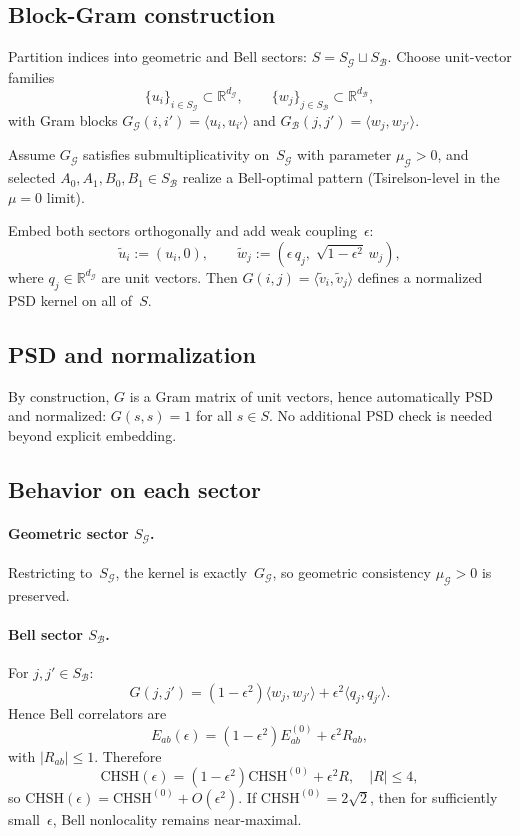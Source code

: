 \documentclass[11pt,a4paper]{article}
\theoremstyle{definition}
\theoremstyle{remark}
\newcommand{\CHSH}{\mathrm{CHSH}}
\newcommand{\ip}[2]{\langle #1, #2 \rangle}
\begin{document}
\subsection{Block-Gram construction}

Partition indices into geometric and Bell sectors: $S = S_{\mathcal{G}} \sqcup S_{\mathcal{B}}$. Choose unit-vector families
\[
\{u_i\}_{i \in S_{\mathcal{G}}} \subset \mathbb{R}^{d_{\mathcal{G}}}, \qquad \{w_j\}_{j \in S_{\mathcal{B}}} \subset \mathbb{R}^{d_{\mathcal{B}}},
\]
with Gram blocks $G_{\mathcal{G}}(i,i') = \ip{u_i}{u_{i'}}$ and $G_{\mathcal{B}}(j,j') = \ip{w_j}{w_{j'}}$.

Assume $G_{\mathcal{G}}$ satisfies submultiplicativity on~$S_{\mathcal{G}}$ with parameter $\mu_{\mathcal{G}} > 0$, and selected $A_0, A_1, B_0, B_1 \in S_{\mathcal{B}}$ realize a Bell-optimal pattern (Tsirelson-level in the $\mu = 0$ limit).

Embed both sectors orthogonally and add weak coupling~$\epsilon$:
\[
\tilde{u}_i := (u_i, 0), \qquad \tilde{w}_j := (\epsilon\, q_j,\; \sqrt{1-\epsilon^2}\, w_j),
\]
where $q_j \in \mathbb{R}^{d_{\mathcal{G}}}$ are unit vectors. Then $G(i,j) = \ip{\tilde{v}_i}{\tilde{v}_j}$ defines a normalized PSD kernel on all of~$S$.

\subsection{PSD and normalization}

By construction, $G$ is a Gram matrix of unit vectors, hence automatically PSD and normalized: $G(s,s) = 1$ for all $s \in S$. No additional PSD check is needed beyond explicit embedding.

\subsection{Behavior on each sector}

\paragraph{Geometric sector $S_{\mathcal{G}}$.}
Restricting to~$S_{\mathcal{G}}$, the kernel is exactly~$G_{\mathcal{G}}$, so geometric consistency $\mu_{\mathcal{G}} > 0$ is preserved.

\paragraph{Bell sector $S_{\mathcal{B}}$.}
For $j, j' \in S_{\mathcal{B}}$:
\[
G(j,j') = (1-\epsilon^2)\ip{w_j}{w_{j'}} + \epsilon^2 \ip{q_j}{q_{j'}}.
\]
Hence Bell correlators are
\[
E_{ab}(\epsilon) = (1-\epsilon^2) E_{ab}^{(0)} + \epsilon^2 R_{ab},
\]
with $|R_{ab}| \le 1$. Therefore
\[
\CHSH(\epsilon) = (1-\epsilon^2)\CHSH^{(0)} + \epsilon^2 R, \quad |R| \le 4,
\]
so $\CHSH(\epsilon) = \CHSH^{(0)} + O(\epsilon^2)$. If $\CHSH^{(0)} = 2\sqrt{2}$, then for sufficiently small~$\epsilon$, Bell nonlocality remains near-maximal.
\end{document}
